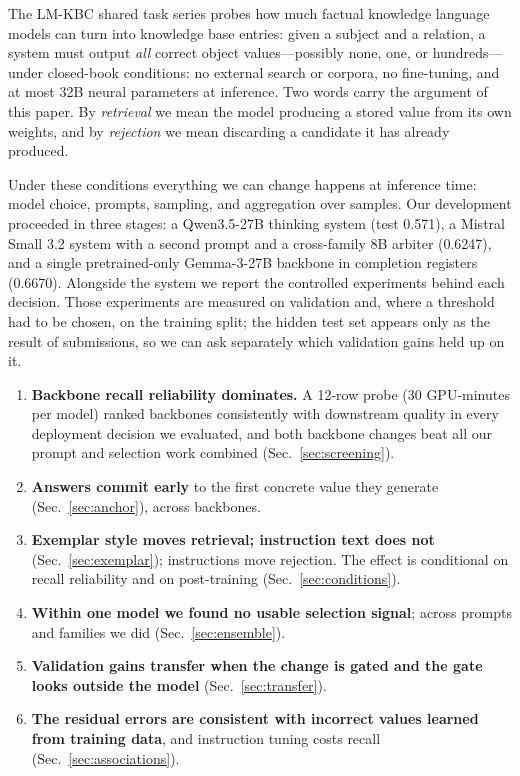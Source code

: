 \documentclass[11pt]{article}
\begin{document}
The LM-KBC shared task series \citep{lmkbc2023,lmkbc2024} probes how much
factual knowledge language models can turn into knowledge base entries:
given a subject and a relation, a system must output \emph{all} correct
object values---possibly none, one, or hundreds---under closed-book
conditions: no external search or corpora, no fine-tuning, and at most
32B neural parameters at inference. Two words carry the argument of this
paper. By \emph{retrieval} we mean the model producing a stored value
from its own weights, and by \emph{rejection} we mean discarding a
candidate it has already produced.

Under these conditions everything we can change happens at inference time: model
choice, prompts, sampling, and aggregation over samples. Our development
proceeded in three stages: a Qwen3.5-27B thinking system (test 0.571), a
Mistral Small 3.2 system with a second prompt and a cross-family 8B
arbiter (0.6247), and a single pretrained-only Gemma-3-27B backbone in
completion registers (0.6670). Alongside the system we report the
controlled experiments behind each decision. Those experiments are
measured on validation and, where a threshold had to be chosen, on the
training split; the hidden test set appears only as the result of
submissions, so we can ask separately which validation gains held up
on it.

\begin{enumerate}
  \item \textbf{Backbone recall reliability dominates.} A 12-row probe
    (30 GPU-minutes per model) ranked backbones consistently with
    downstream quality in every deployment decision we evaluated, and
    both backbone changes beat all our prompt and selection work combined
    (Sec.~\ref{sec:screening}).
  \item \textbf{Answers commit early} to the first concrete value they
    generate (Sec.~\ref{sec:anchor}), across backbones.
  \item \textbf{Exemplar style moves retrieval; instruction text does
    not} (Sec.~\ref{sec:exemplar}); instructions move rejection. The
    effect is conditional on recall reliability and on post-training
    (Sec.~\ref{sec:conditions}).
  \item \textbf{Within one model we found no usable selection signal};
    across prompts and families we did (Sec.~\ref{sec:ensemble}).
  \item \textbf{Validation gains transfer when the change is gated and
    the gate looks outside the model} (Sec.~\ref{sec:transfer}).
  \item \textbf{The residual errors are consistent with incorrect values
    learned from training data}, and instruction tuning costs recall
    (Sec.~\ref{sec:associations}).
\end{enumerate}
\end{document}
